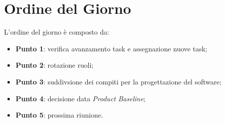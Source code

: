 \section{Ordine del Giorno}
L'ordine del giorno è composto da: 
\begin{itemize}
	\item \textbf{Punto 1}: verifica avanzamento task e assegnazione nuove task;
	\item \textbf{Punto 2}: rotazione ruoli; 
	\item \textbf{Punto 3}: suddivsione dei compiti per la progettazione del software;
	\item \textbf{Punto 4}: decisione data \textit{Product Baseline}\glossario;
	\item \textbf{Punto 5}: prossima riunione.
\end{itemize}